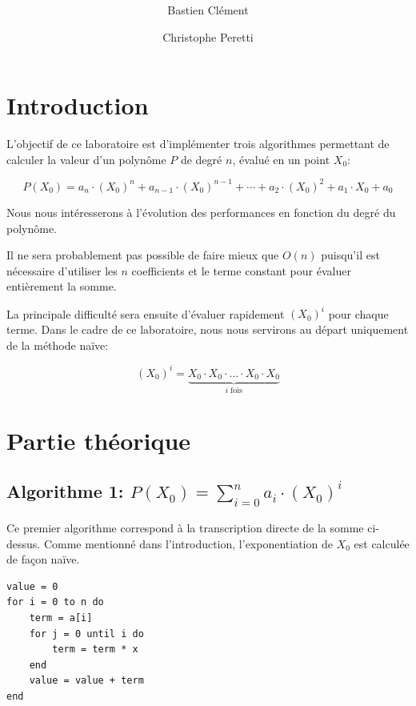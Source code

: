 \documentclass[11pt,a4paper]{article}
\author{Bastien Clément \and Christophe Peretti}
\title{{\normalsize \doccourse} \\ \doctitle }
\begin{document}
\maketitle

\section{Introduction}

L'objectif de ce laboratoire est d'implémenter trois algorithmes permettant de calculer la valeur d'un polynôme $P$ de degré $n$, évalué en un point $X_{0}$:

\[
	P(X_{0})
		= a_{n} \cdot (X_{0})^{n}
		+ a_{n-1} \cdot (X_{0})^{n-1}
		+ \cdots
		+ a_{2} \cdot (X_{0})^{2}
		+ a_{1} \cdot X_{0}
		+ a_{0}
\]

Nous nous intéresserons à l'évolution des performances en fonction du degré du polynôme.

Il ne sera probablement pas possible de faire mieux que $O(n)$ puisqu'il est nécessaire d'utiliser les $n$ coefficients et le terme constant pour évaluer entièrement la somme.

La principale difficulté sera ensuite d'évaluer rapidement $(X_{0})^{i}$ pour chaque terme. Dans le cadre de ce laboratoire, nous nous servirons au départ uniquement de la méthode naïve:

\[
	(X_{0})^{i} = \underbrace{X_{0} \cdot X_{0} \cdot \ldots \cdot X_{0} \cdot X_{0}}_{i \text{ fois}}
\]


\section{Partie théorique}

\subsection{Algorithme 1: $ P(X_{0}) = \sum\limits_{i=0}^{n} a_{i} \cdot (X_{0})^{i} $}

Ce premier algorithme correspond à la transcription directe de la somme ci-dessus. Comme mentionné dans l'introduction, l'exponentiation de $X_{0}$ est calculée de façon naïve.

\vspace{1em} \begin{lstlisting}
value = 0
for i = 0 to n do
	term = a[i]
	for j = 0 until i do
		term = term * x
	end
	value = value + term
end
\end{lstlisting}
\end{document}
